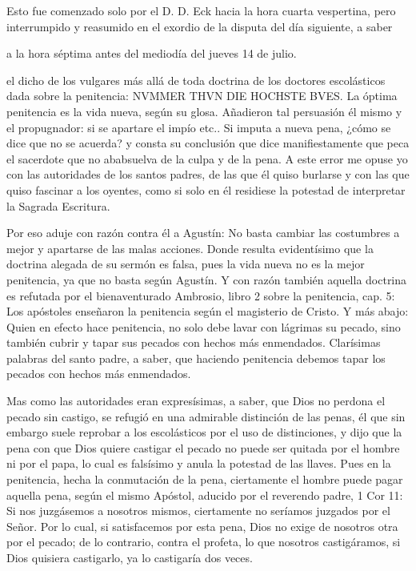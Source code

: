 Esto fue comenzado solo por el D. D. Eck hacia la hora cuarta vespertina, pero interrumpido y reasumido en el exordio de la disputa del día siguiente, a saber

a la hora séptima antes del mediodía del jueves 14 de julio.

el dicho de los vulgares más allá de toda doctrina de los doctores escolásticos dada sobre la penitencia: NVMMER THVN DIE HOCHSTE BVES. La óptima penitencia es la vida nueva, según su glosa. Añadieron tal persuasión él mismo y el propugnador: si se apartare el impío etc.. Si imputa a nueva pena, ¿cómo se dice que no se acuerda? y consta su conclusión que dice manifiestamente que peca el sacerdote que no ababsuelva de la culpa y de la pena. A este error me opuse yo con las autoridades de los santos padres, de las que él quiso burlarse y con las que quiso fascinar a los oyentes, como si solo en él residiese la potestad de interpretar la Sagrada Escritura.

Por eso aduje con razón contra él a Agustín: No basta cambiar las costumbres a mejor y apartarse de las malas acciones. Donde resulta evidentísimo que la doctrina alegada de su sermón es falsa, pues la vida nueva no es la mejor penitencia, ya que no basta según Agustín. Y con razón también aquella doctrina es refutada por el bienaventurado Ambrosio, libro 2 sobre la penitencia, cap. 5: Los apóstoles enseñaron la penitencia según el magisterio de Cristo. Y más abajo: Quien en efecto hace penitencia, no solo debe lavar con lágrimas su pecado, sino también cubrir y tapar sus pecados con hechos más enmendados. Clarísimas palabras del santo padre, a saber, que haciendo penitencia debemos tapar los pecados con hechos más enmendados.

Mas como las autoridades eran expresísimas, a saber, que Dios no perdona el pecado sin castigo, se refugió en una admirable distinción de las penas, él que sin embargo suele reprobar a los escolásticos por el uso de distinciones, y dijo que la pena con que Dios quiere castigar el pecado no puede ser quitada por el hombre ni por el papa, lo cual es falsísimo y anula la potestad de las llaves. Pues en la penitencia, hecha la conmutación de la pena, ciertamente el hombre puede pagar aquella pena, según el mismo Apóstol, aducido por el reverendo padre, 1 Cor 11: Si nos juzgásemos a nosotros mismos, ciertamente no seríamos juzgados por el Señor. Por lo cual, si satisfacemos por esta pena, Dios no exige de nosotros otra por el pecado; de lo contrario, contra el profeta, lo que nosotros castigáramos, si Dios quisiera castigarlo, ya lo castigaría dos veces.

